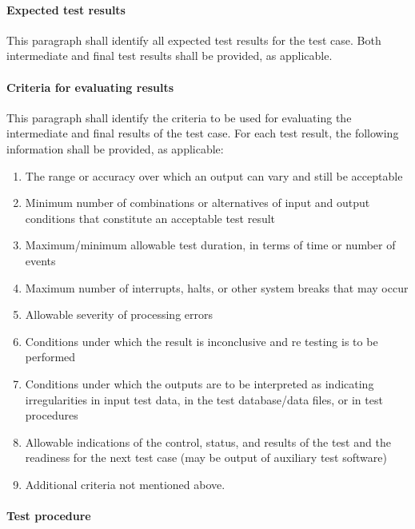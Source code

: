 \paragraph{Expected test results}

This paragraph shall identify all expected test results for the test
case. Both intermediate and final test results shall be provided, as
applicable.

\paragraph{Criteria for evaluating results}

This paragraph shall identify the criteria to be used for evaluating the
intermediate and final results of the test case. For each test result,
the following information shall be provided, as applicable:

\begin{enumerate}
\itemsep1pt\parskip0pt
\item
  The range or accuracy over which an output can vary and still be
  acceptable
\item
  Minimum number of combinations or alternatives of input and output
  conditions that constitute an acceptable test result
\item
  Maximum/minimum allowable test duration, in terms of time or number of
  events
\item
  Maximum number of interrupts, halts, or other system breaks that may
  occur
\item
  Allowable severity of processing errors
\item
  Conditions under which the result is inconclusive and re testing is to
  be performed
\item
  Conditions under which the outputs are to be interpreted as indicating
  irregularities in input test data, in the test database/data files, or
  in test procedures
\item
  Allowable indications of the control, status, and results of the test
  and the readiness for the next test case (may be output of auxiliary
  test software)
\item
  Additional criteria not mentioned above.
\end{enumerate}

\paragraph{Test procedure}

